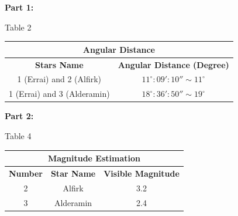 
\textbf{Part 1:}

\begin{center}
Table 2

\begin{tabular}{|c|c|}
\hline
\multicolumn{2}{|c|}{\textbf{Angular Distance}}\\
\hline
\textbf{Stars Name} & \textbf{Angular Distance (Degree)}\\
\hline
1 (Errai) and 2 (Alfirk) & $11^\circ\!:09':10'' \sim 11^\circ$\\
\hline
1 (Errai) and 3 (Alderamin) & $18^\circ\!:36':50'' \sim 19^\circ$\\
\hline
\end{tabular}
\end{center}

\textbf{Part 2:}

\begin{center}
Table 4

\begin{tabular}{|c|c|c|}
\hline
\multicolumn{3}{|c|}{\textbf{Magnitude Estimation}}\\
\hline
\textbf{Number} & \textbf{Star Name} & \textbf{Visible Magnitude}\\
\hline
2 & Alfirk & 3.2\\
\hline
3 & Alderamin & 2.4\\
\hline
\end{tabular}
\end{center}

